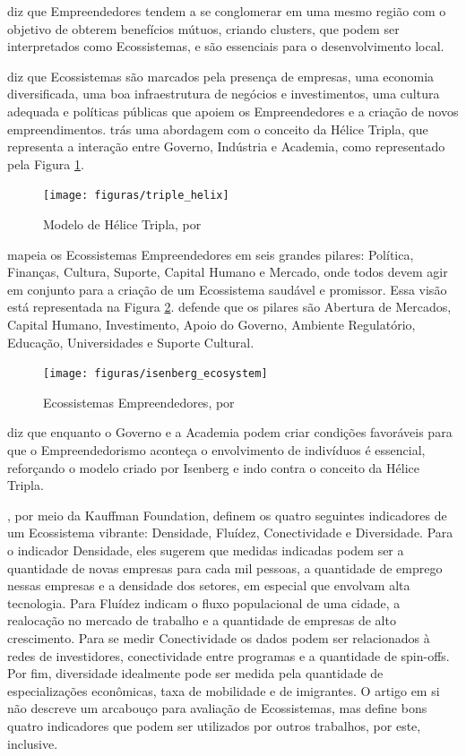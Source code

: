  diz que Empreendedores tendem a se conglomerar em uma mesmo região com o objetivo de obterem benefícios mútuos, criando clusters, que podem ser interpretados como Ecossistemas, e são essenciais para o desenvolvimento local.

 diz que Ecossistemas são marcados pela presença de empresas, uma economia diversificada, uma boa infraestrutura de negócios e investimentos, uma cultura adequada e políticas públicas que apoiem os Empreendedores e a criação de novos empreendimentos.  trás uma abordagem com o conceito da Hélice Tripla, que representa a interação entre Governo, Indústria e Academia, como representado pela Figura \ref{figure:triple_helix}. 

\begin{figure}[!htb]
\centering
\texttt{[image: figuras/triple\_helix]}
\caption{Modelo de Hélice Tripla, por }
\label{figure:triple_helix}
\end{figure}

 mapeia os Ecossistemas Empreendedores em seis grandes pilares: Política, Finanças, Cultura, Suporte, Capital Humano e Mercado, onde todos devem agir em conjunto para a criação de um Ecossistema saudável e promissor. Essa visão está representada na Figura \ref{figure:isenberg_ecosystem}.  defende que os pilares são Abertura de Mercados, Capital Humano, Investimento, Apoio do Governo, Ambiente Regulatório, Educação, Universidades e Suporte Cultural.

\begin{figure}[!htb]
\centering
\texttt{[image: figuras/isenberg\_ecosystem]}
\caption{Ecossistemas Empreendedores, por }
\label{figure:isenberg_ecosystem}
\end{figure}

 diz que enquanto o Governo e a Academia podem criar condições favoráveis para que o Empreendedorismo aconteça o envolvimento de indivíduos é essencial, reforçando o modelo criado por Isenberg e indo contra o conceito da Hélice Tripla.

, por meio da Kauffman Foundation, definem os quatro seguintes indicadores de um Ecossistema vibrante: Densidade, Fluídez, Conectividade e Diversidade. Para o indicador Densidade, eles sugerem que medidas indicadas podem ser a quantidade de novas empresas para cada mil pessoas, a quantidade de emprego nessas empresas e a densidade dos setores, em especial que envolvam alta tecnologia. Para Fluídez indicam o fluxo populacional de uma cidade, a realocação no mercado de trabalho e a quantidade de empresas de alto crescimento. Para se medir Conectividade os dados podem ser relacionados à redes de investidores, conectividade entre programas e a quantidade de spin-offs. Por fim, diversidade idealmente pode ser medida pela quantidade de especializações econômicas, taxa de mobilidade e de imigrantes. O artigo em si não descreve um arcabouço para avaliação de Ecossistemas, mas define bons quatro indicadores que podem ser utilizados por outros trabalhos, por este, inclusive. 

